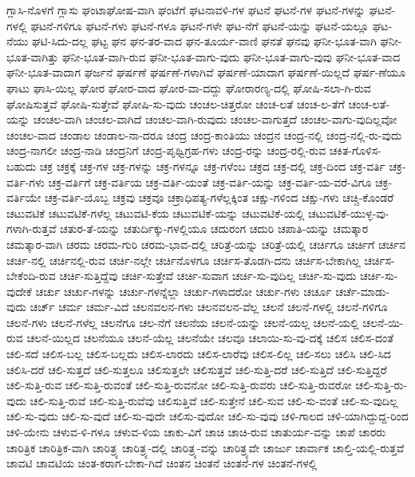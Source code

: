 {ಗ್ಲಾಸಿ-ನೊಳಗೆ
ಗ್ಲಾಸು
ಘಂಟಾಘೋಷ-ವಾಗಿ
ಘಂಟೆಗೆ
ಘಟನಾವಳಿ-ಗಳ
ಘಟನೆ
ಘಟನೆ-ಗಳ
ಘಟನೆ-ಗಳನ್ನು
ಘಟನೆ-ಗಳಲ್ಲಿ
ಘಟನೆ-ಗಳಿಗೂ
ಘಟನೆ-ಗಳು
ಘಟನೆ-ಗಳೂ
ಘಟನೆ-ಗಳೇ
ಘಟ-ನೆಗೆ
ಘಟನೆ-ಯನ್ನು
ಘಟನೆ-ಯಲ್ಲೂ
ಘಟ-ನೆಯು
ಘಟಿ-ಸಿದು-ದಲ್ಲ
ಘಟ್ಟ
ಘನ
ಘನ-ತರ-ವಾದ
ಘನ-ತೂರ್ಯ-ವಾಣಿ
ಘನತೆ
ಘನವು
ಘನೀ-ಭೂತ-ವಾಗಿ
ಘನೀ-ಭೂತ-ವಾಗಿತ್ತು
ಘನೀ-ಭೂತ-ವಾಗಿ-ರುವ
ಘನೀ-ಭೂತ-ವಾಗು-ವುದು
ಘನೀ-ಭೂತ-ವಾಗು-ವುವು
ಘನೀ-ಭೂತ-ವಾದ
ಘನೀ-ಭೂತ-ವಾದಾಗ
ಘರ್ಜನೆ
ಘರ್ಷಣೆ
ಘರ್ಷಣೆ-ಗಳಾಗಿವೆ
ಘರ್ಷಣೆ-ಯಾದಾಗ
ಘರ್ಷಣೆ-ಯಿಲ್ಲದೆ
ಘರ್ಷ-ಣೆಯೂ
ಘಾಟು
ಘಾಸಿ-ಯಿಲ್ಲ
ಘೋರ
ಘೋರ-ವಾದ
ಘೋರ-ವಾ-ದದ್ದು
ಘೋರಾರಣ್ಯ-ದಲ್ಲಿ
ಘೋಷಿ-ಸಲಾ-ಗಿ-ರುವ
ಘೋಷಿಸುತ್ತವೆ
ಘೋಷಿ-ಸುತ್ತೇವೆ
ಘೋಷಿ-ಸು-ವುದು
ಚಂಚಲ-ಚಿತ್ತರೋ
ಚಂಚ-ಲತೆ
ಚಂಚ-ಲ-ತೆಗೆ
ಚಂಚ-ಲತೆ-ಯನ್ನು
ಚಂಚಲ-ವಾಗಿ
ಚಂಚಲ-ವಾಗಿದೆ
ಚಂಚಲ-ವಾಗಿ-ರುವುದು
ಚಂಚಲ-ವಾಗುತ್ತದೆ
ಚಂಚಲ-ವಾಗು-ವುದಿಲ್ಲವೋ
ಚಂಚಲ-ವಾದ
ಚಂಡಾಲ
ಚಂಡಾಲ-ನಾ-ದರೂ
ಚಂದ್ರ
ಚಂದ್ರ-ಕಾಂತಿಯು
ಚಂದ್ರನ
ಚಂದ್ರ-ನಲ್ಲಿ
ಚಂದ್ರ-ನಲ್ಲಿ-ರು-ವುದು
ಚಂದ್ರ-ನಾಗಲೀ
ಚಂದ್ರ-ನಾಡಿ
ಚಂದ್ರನಿಗೆ
ಚಂದ್ರ-ಪೃಥ್ವಿಗ್ರಹ-ಗಳು
ಚಂದ್ರ-ರನ್ನು
ಚಂದ್ರ-ರಲ್ಲಿ-ರುವ
ಚಕಿತ-ಗೊಳಿಸ-ಬಹುದು
ಚಕ್ರ
ಚಕ್ರಕ್ಕೆ
ಚಕ್ರ-ಗಳ
ಚಕ್ರ-ಗಳನ್ನು
ಚಕ್ರ-ಗಳನ್ನೂ
ಚಕ್ರ-ಗಳೆಂಬ
ಚಕ್ರದ
ಚಕ್ರ-ದಲ್ಲಿ
ಚಕ್ರ-ದಿಂದ
ಚಕ್ರ-ವರ್ತಿ
ಚಕ್ರ-ವರ್ತಿ-ಗಳು
ಚಕ್ರ-ವರ್ತಿಗೆ
ಚಕ್ರ-ವರ್ತಿಯ
ಚಕ್ರ-ವರ್ತಿ-ಯಂತೆ
ಚಕ್ರ-ವರ್ತಿ-ಯನ್ನು
ಚಕ್ರ-ವರ್ತಿ-ಯ-ವರೆ-ವಿಗೂ
ಚಕ್ರ-ವರ್ತಿಯೇ
ಚಕ್ರ-ವರ್ತಿ-ಯೊಬ್ಬ
ಚಕ್ರವು
ಚಕ್ರವೂ
ಚಕ್ರಾಧಿಪತ್ಯ-ಗಳೆಲ್ಲಕ್ಕಿಂತ
ಚಕ್ಷು-ಗಳಿಂದ
ಚಕ್ಷು-ಗಳು
ಚಚ್ಚಿ-ಕೊಂಡರೆ
ಚಟುವಟಿಕೆ
ಚಟುವಟಿಕೆ-ಗಳೆಲ್ಲ
ಚಟುವಟಿ-ಕೆಯ
ಚಟುವಟಿಕೆ-ಯನ್ನು
ಚಟುವಟಿಕೆ-ಯಲ್ಲಿ
ಚಟುವಟಿಕೆ-ಯುಳ್ಳ-ವು-ಗಳಾಗಿ-ರುತ್ತವೆ
ಚತುರ-ತೆ-ಯನ್ನು
ಚತುರ್ದಿಕ್ಕು-ಗಳಲ್ಲಿಯೂ
ಚದುರಂಗ
ಚದುರಿ
ಚಪಾತಿ-ಯನ್ನು
ಚಮತ್ಕಾರ
ಚಮತ್ಕಾರ-ವಾಗಿ
ಚರಮ
ಚರಮ-ಗುರಿ
ಚರಮ-ಭಾವ-ದಲ್ಲಿ
ಚರಿತ್ರೆ-ಯನ್ನು
ಚರಿತ್ರೆ-ಯಲ್ಲಿ
ಚರ್ಚಿಗೂ
ಚರ್ಚಿಗೆ
ಚರ್ಚಿನ
ಚರ್ಚಿ-ನಲ್ಲಿ
ಚರ್ಚಿನಲ್ಲಿ-ರುವ
ಚರ್ಚಿ-ನಲ್ಲೇ
ಚರ್ಚಿನೊಳಗೂ
ಚರ್ಚಿಸ-ತೊಡಗಿ-ದನು
ಚರ್ಚಿಸ-ಬೇಕಾಗಿಲ್ಲ
ಚರ್ಚಿಸ-ಬೇಕೆಂದಿ-ರುವ
ಚರ್ಚಿ-ಸುತ್ತಿದ್ದೆವು
ಚರ್ಚಿ-ಸುತ್ತೇವೆ
ಚರ್ಚಿ-ಸುವಾಗ
ಚರ್ಚಿ-ಸು-ವುದಿಲ್ಲ
ಚರ್ಚಿ-ಸು-ವುದು
ಚರ್ಚಿ-ಸು-ವುದೇಕೆ
ಚರ್ಚು
ಚರ್ಚು-ಗಳನ್ನು
ಚರ್ಚು-ಗಳನ್ನೆಲ್ಲಾ
ಚರ್ಚು-ಗಳಾದರೋ
ಚರ್ಚು-ಗಳು
ಚರ್ಚೂ
ಚರ್ಚೆ-ಮಾಡು-ವುದು
ಚರ್ಚ್
ಚರ್ಮ
ಚರ್ಮ-ವಿದೆ
ಚಲನವಲನ-ಗಳು
ಚಲನವಲನ-ವೆಲ್ಲ
ಚಲನೆ
ಚಲನೆ-ಗಳಲ್ಲಿ
ಚಲನೆ-ಗಳಿಗೂ
ಚಲನೆ-ಗಳು
ಚಲನೆ-ಗಳೆಲ್ಲ
ಚಲನೆಗೂ
ಚಲ-ನೆಗೆ
ಚಲನೆಯ
ಚಲನೆ-ಯನ್ನು
ಚಲನೆ-ಯಲ್ಲ
ಚಲನೆ-ಯಲ್ಲಿ
ಚಲನೆ-ಯಿ-ರುವ
ಚಲನೆ-ಯಿಲ್ಲದ
ಚಲನೆಯೂ
ಚಲನೆ-ಯೆಲ್ಲ
ಚಲನೆಯೇ
ಚಲವೂ
ಚಲಾಯಿ-ಸು-ವು-ದಕ್ಕೆ
ಚಲಿಸ
ಚಲಿಸ-ದಂತೆ
ಚಲಿ-ಸದೆ
ಚಲಿಸ-ಬಲ್ಲ
ಚಲಿಸ-ಬಲ್ಲದು
ಚಲಿಸ-ಲಾರದು
ಚಲಿಸ-ಲಾರೆವು
ಚಲಿಸ-ಲಿಲ್ಲ
ಚಲಿ-ಸಲು
ಚಲಿಸಿ
ಚಲಿ-ಸಿದ
ಚಲಿಸಿ-ದರೆ
ಚಲಿ-ಸುತ್ತದೆ
ಚಲಿ-ಸುತ್ತಲೂ
ಚಲಿಸುತ್ತಲೇ
ಚಲಿಸುತ್ತವೆ
ಚಲಿ-ಸುತ್ತಿ-ದರೆ
ಚಲಿ-ಸುತ್ತಿದೆ
ಚಲಿ-ಸುತ್ತಿದ್ದರೆ
ಚಲಿ-ಸುತ್ತಿ-ರುವ
ಚಲಿ-ಸುತ್ತಿ-ರುವಂತೆ
ಚಲಿ-ಸುತ್ತಿ-ರುವನೋ
ಚಲಿ-ಸುತ್ತಿ-ರುವರು
ಚಲಿ-ಸುತ್ತಿ-ರುವರೋ
ಚಲಿ-ಸುತ್ತಿ-ರು-ವುದು
ಚಲಿ-ಸುತ್ತಿ-ರುವೆ
ಚಲಿ-ಸುತ್ತಿ-ರುವೆವು
ಚಲಿಸುತ್ತಿವೆ
ಚಲಿ-ಸುತ್ತೇನೆ
ಚಲಿ-ಸುವ
ಚಲಿ-ಸು-ವಂತೆ
ಚಲಿ-ಸು-ವುದಿಲ್ಲ
ಚಲಿ-ಸು-ವುದು
ಚಲಿ-ಸು-ವುದೆ
ಚಲಿ-ಸು-ವುದೇ
ಚಲಿಸು-ವುದೋ
ಚಲಿ-ಸು-ವುವು
ಚಳಿ-ಗಾಲದ
ಚಳಿ-ಯಾಗಿದ್ದುದ್ದ-ರಿಂದ
ಚಳಿ-ಯೇನು
ಚಳುವ-ಳಿ-ಗಳೂ
ಚಳುವ-ಳಿಯ
ಚಾಕು-ವಿಗೆ
ಚಾಚಿ
ಚಾಚಿ-ರುವ
ಚಾತುರ್ಯ-ವನ್ನು
ಚಾಪೆ
ಚಾರರು
ಚಾರಿತ್ರಿಕ
ಚಾರಿತ್ರಿಕ-ವಾಗಿ
ಚಾರಿತ್ರ್ಯ
ಚಾರಿತ್ರ್ಯ-ದಲ್ಲಿ
ಚಾರಿತ್ರ್ಯ-ವನ್ನು
ಚಾರಿತ್ರ್ಯವೇ
ಚಾರ್ಜು
ಚಾರ್ವಾಕ
ಚಾಲ್ತಿ-ಯಲ್ಲಿ-ರುತ್ತವೆ
ಚಾವಟಿ
ಚಾವಟಿಯ
ಚಿಂತ-ಕರಾಗ-ಬೇಕಾ-ಗಿದೆ
ಚಿಂತನ
ಚಿಂತನೆ
ಚಿಂತನೆ-ಗಳ
ಚಿಂತನೆ-ಗಳಲ್ಲಿ
}
